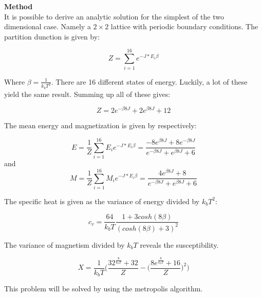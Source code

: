 \documentclass[10pt,a4paper]{article}
\begin{document}
{\LARGE\bf
Method
}\\

\noindent It is possible to derive an analytic solution for the simplest of the two dimensional case. Namely a $2 \times 2$ lattice with periodic boundary conditions. The partition dunction is given by:

\begin{equation}
Z= \sum\limits_{i=1}^{16}  e^{-J*E_{i}\beta}
\end{equation}

\noindent Where $\beta= \frac{1}{k_b T^2}$.  There are 16 different states of energy. Luckily, a lot of these yield the same result. Summing up all of these gives:

\begin{equation}
Z=2e^{-\beta 8 J}+2e^{\beta 8 J}+12
\end{equation}

\noindent The mean energy and magnetization is given by respectively:

\begin{equation}
E=\frac{1}{Z} \sum\limits_{i=1}^{16}  E_{i}e^{-J*E_{i}\beta}=\frac{-8e^{\beta 8J }+8e^{-\beta 8J}}{e^{-\beta 8 J}+e^{\beta 8 J}+6}
\end{equation}
and
\begin{equation}
M=\frac{1}{Z}\sum\limits_{i=1}^{16}  M_{i}e^{-J*E_{i}\beta}=\frac{4e^{\beta 8J}+8}{e^{-\beta 8 J}+e^{\beta 8 J}+6}
\end{equation}

\noindent The specific heat is given as the variance of energy divided by $k_b T^2$:

\begin{equation} 
c_v =\frac{64}{k_b T} \frac{1+3cosh(8\beta)}{(cosh(8\beta)+3)^2}
\end{equation}

\noindent The variance of magnetism divided by $k_b T$ reveals the susceptibility.

\begin{equation}
X=\frac{1}{k_b T} \Bigg(\frac{32^{\frac{8}{k_b T}}+32}{Z} - \Big(\frac{8e^{\frac{8}{k_b T}}+16}{Z}\Big)^2\Bigg)
\end{equation}

\noindent This problem will be solved by using the metropolis algorithm. 
\end{document}
